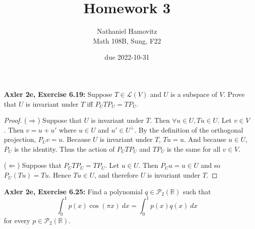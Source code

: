 \documentclass{article}
\newcommand{\R}{\mathbb{R}}
\begin{document}
\renewcommand{\labelenumi}{(\alph{enumi})}


\title{Homework 3} %
\author{Nathaniel Hamovitz\\Math 108B, Sung, F22}
\date{due 2022-10-31}

\maketitle


\textbf{Axler 2e, Exercise 6.19: } %
Suppose $T \in \mathcal{L}(V)$ and $U$ is a subspace of $V$. Prove that $U$ is invariant under $T$ iff $P_U T P_U = T P_U$.

\begin{proof}
    ($\Longrightarrow$) Suppose that $U$ is invariant under $T$. Then $\forall u \in U, Tu \in U$. Let $v \in V$. Then $v = u + u'$ where $u \in U$ and $u' \in U^\perp$. By the definition of the orthogonal projection, $P_U v = u$. Because $U$ is invariant under $T$, $T u = u$. And because $u \in U$, $P_U$ is the identity. Thus the action of $P_U T P_U$ and $T P_U$ is the same for all $v \in V$. 

    ($\Longleftarrow$) Suppose that $P_U T P_U  = T P_U$. 
    Let $u \in U$. Then $P_U u = u \in U$ and so $P_U(T u) = Tu$. Hence $Tu \in U$, and therefore $U$ is invariant under $T$.    
\end{proof}




\textbf{Axler 2e, Exercise 6.25: } %
Find a polynomial $q \in \mathcal{P}_2(\R)$ such that
$$\int_0^1 p(x) \cos(\pi x) \: dx = \int_0^1 p(x) q(x) \: dx$$
for every $p \in \mathcal{P}_2(\R)$.
\end{document}
